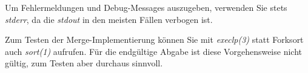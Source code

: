 Um Fehlermeldungen und Debug-Messages auszugeben, verwenden Sie stets
\emph{stderr}, da die \emph{stdout} in den meisten Fällen verbogen ist.

Zum Testen der Merge-Implementierung können Sie mit \emph{execlp(3)} statt
Forksort auch \emph{sort(1)} aufrufen. Für die endgültige Abgabe ist diese
Vorgehensweise nicht gültig, zum Testen aber durchaus sinnvoll.

\osueguidelinestwo


